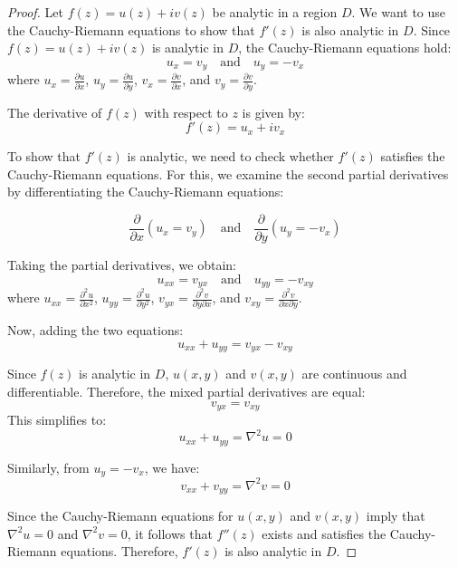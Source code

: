 \documentclass[12pt]{book}
\begin{document}
\begin{proof}
Let \( f(z) = u(z) + iv(z) \) be analytic in a region \( D \). We want to use the Cauchy-Riemann equations to show that \( f'(z) \) is also analytic in \( D \).
Since \( f(z) = u(z) + iv(z) \) is analytic in \( D \), the Cauchy-Riemann equations hold:
\[
u_x = v_y \quad \text{and} \quad u_y = -v_x
\]
where \( u_x = \frac{\partial u}{\partial x} \), \( u_y = \frac{\partial u}{\partial y} \), \( v_x = \frac{\partial v}{\partial x} \), and \( v_y = \frac{\partial v}{\partial y} \).

The derivative of \( f(z) \) with respect to \( z \) is given by:
\[
f'(z) = u_x + iv_x
\]

To show that \( f'(z) \) is analytic, we need to check whether \( f'(z) \) satisfies the Cauchy-Riemann equations. For this, we examine the second partial derivatives by differentiating the Cauchy-Riemann equations:

\[
\frac{\partial}{\partial x} (u_x = v_y) \quad \text{and} \quad \frac{\partial}{\partial y} (u_y = -v_x)
\]

Taking the partial derivatives, we obtain:
\[
u_{xx} = v_{yx} \quad \text{and} \quad u_{yy} = -v_{xy}
\]
where \( u_{xx} = \frac{\partial^2 u}{\partial x^2} \), \( u_{yy} = \frac{\partial^2 u}{\partial y^2} \), \( v_{yx} = \frac{\partial^2 v}{\partial y \partial x} \), and \( v_{xy} = \frac{\partial^2 v}{\partial x \partial y} \).

Now, adding the two equations:
\[
u_{xx} + u_{yy} = v_{yx} - v_{xy}
\]

Since \( f(z) \) is analytic in \( D \), \( u(x,y) \) and \( v(x,y) \) are continuous and differentiable. Therefore, the mixed partial derivatives are equal:
\[
v_{yx} = v_{xy}
\]
This simplifies to:
\[
u_{xx} + u_{yy} = \nabla^2 u = 0
\]

Similarly, from \( u_y = -v_x \), we have:
\[
v_{xx} + v_{yy} = \nabla^2 v = 0
\]

Since the Cauchy-Riemann equations for \( u(x,y) \) and \( v(x,y) \) imply that \( \nabla^2 u = 0 \) and \( \nabla^2 v = 0 \), it follows that \( f''(z) \) exists and satisfies the Cauchy-Riemann equations. Therefore, \( f'(z) \) is also analytic in \( D \).
\end{proof}
\end{document}
